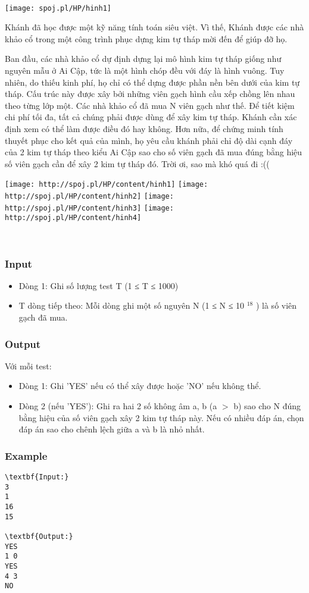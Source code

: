 

 


\texttt{[image: spoj.pl/HP/hinh1]}

Khánh đã học được một kỹ năng tính toán siêu việt. Vì thế, Khánh được các nhà khảo cổ trong một công trình phục dựng kim tự tháp mời đến để giúp đỡ họ.

Ban đầu, các nhà khảo cổ dự định dựng lại mô hình kim tự tháp giống như nguyên mẫu ở Ai Cập, tức là một hình chóp đều với đáy là hình vuông. Tuy nhiên, do thiếu kinh phí, họ chỉ có thể dựng được phần nền bên dưới của kim tự tháp. Cấu trúc này được xây bởi những viên gạch hình cầu xếp chồng lên nhau theo từng lớp một. Các nhà khảo cổ đã mua N viên gạch như thế. Để tiết kiệm chi phí tối đa, tất cả chúng phải được dùng để xây kim tự tháp. Khánh cần xác định xem có thể làm được điều đó hay không. Hơn nữa, để chứng minh tính thuyết phục cho kết quả của mình, họ yêu cầu khánh phải chỉ độ dài cạnh đáy của 2 kim tự tháp theo kiểu Ai Cập sao cho số viên gạch đã mua đúng bằng hiệu số viên gạch cần để xây 2 kim tự tháp đó. Trời ơi, sao mà khó quá đi :((


\texttt{[image: http://spoj.pl/HP/content/hinh1]}
\texttt{[image: http://spoj.pl/HP/content/hinh2]}
\texttt{[image: http://spoj.pl/HP/content/hinh3]}
\texttt{[image: http://spoj.pl/HP/content/hinh4]}

 

\subsubsection{Input}
\begin{itemize}
	\item Dòng 1: Ghi số lượng test T (1 ≤ T ≤ 1000)
	\item T dòng tiếp theo: Mỗi dòng ghi một số nguyên N (1 ≤ N ≤ 10 $^ 18 $ ) là số viên gạch đã mua.
\end{itemize}

\subsubsection{Output}

Với mỗi test:
\begin{itemize}
	\item Dòng 1: Ghi 'YES' nếu có thể xây được hoặc 'NO' nếu không thể.
	\item Dòng 2 (nếu 'YES'): Ghi ra hai 2 số không âm a, b (a $>$ b) sao cho N đúng bằng hiệu của số viên gạch xây 2 kim tự tháp này. Nếu có nhiều đáp án, chọn đáp án sao cho chênh lệch giữa a và b là nhỏ nhất.
\end{itemize}

\subsubsection{Example}
\begin{verbatim}
\textbf{Input:}
3
1
16
15

\textbf{Output:}
YES
1 0
YES
4 3
NO
\end{verbatim}